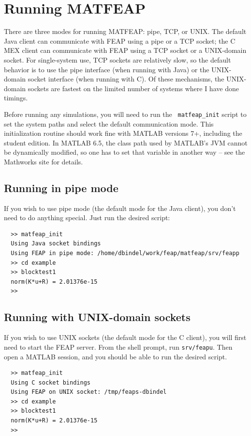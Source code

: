 \documentclass[12pt]{article}
\begin{document}
\section{Running MATFEAP}

There are three modes for running MATFEAP: pipe, TCP, or UNIX.
The default Java client can communicate with FEAP using a pipe or
a TCP socket; the C MEX client can communicate with FEAP using a
TCP socket or a UNIX-domain socket.  For single-system use, TCP
sockets are relatively slow, so the default behavior is to use
the pipe interface (when running with Java) or the UNIX-domain
socket interface (when running with C).  Of these mechanisms,
the UNIX-domain sockets are fastest on the limited number of systems
where I have done timings.

Before running any simulations, you will need to run the {\tt
  matfeap\_init} script to set the system paths and select the default
communication mode.  This initialization routine should work fine with
MATLAB versions 7+, including the student edition.  In MATLAB 6.5, the
class path used by MATLAB's JVM cannot be dynamically modified, so one
has to set that variable in another way -- see the Mathworks site for
details.


\subsection{Running in pipe mode}

If you wish to use pipe mode (the default mode for the Java client),
you don't need to do anything special.  Just run the desired script:
\begin{verbatim}
  >> matfeap_init
  Using Java socket bindings
  Using FEAP in pipe mode: /home/dbindel/work/feap/matfeap/srv/feapp
  >> cd example
  >> blocktest1
  norm(K*u+R) = 2.01376e-15
  >>
\end{verbatim}


\subsection{Running with UNIX-domain sockets}

If you wish to use UNIX sockets (the default mode for the C client),
you will first need to start the FEAP server.  From the shell prompt,
run {\tt srv/feapu}.  Then open a MATLAB session, and you should be
able to run the desired script.
\begin{verbatim}
  >> matfeap_init
  Using C socket bindings
  Using FEAP on UNIX socket: /tmp/feaps-dbindel
  >> cd example
  >> blocktest1
  norm(K*u+R) = 2.01376e-15
  >> 
\end{verbatim}
\end{document}
